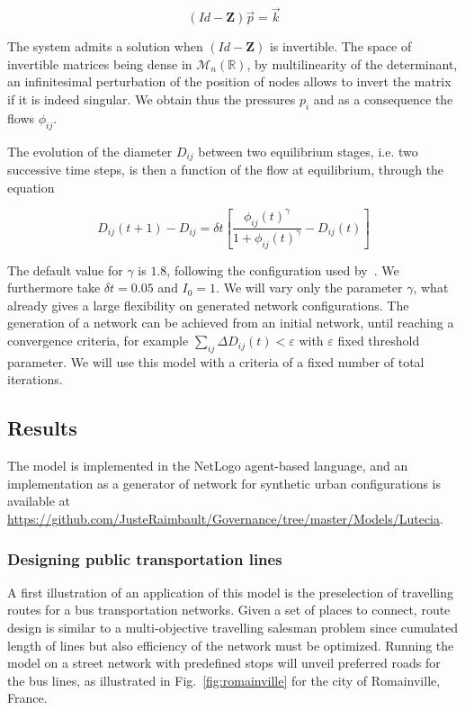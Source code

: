 \documentclass[runningheads,a4paper]{llncs2e/llncs}
\begin{document}
\begin{equation}
\left(Id - \mathbf{Z}\right) \vec{p} = \vec{k}
\end{equation}

The system admits a solution when $\left(Id - \mathbf{Z}\right)$ is invertible. The space of invertible matrices being dense in $\mathcal{M}_n(\mathbb{R})$, by multilinearity of the determinant, an infinitesimal perturbation of the position of nodes allows to invert the matrix if it is indeed singular. We obtain thus the pressures $p_i$ and as a consequence the flows $\phi_{ij}$.

The evolution of the diameter $D_{ij}$ between two equilibrium stages, i.e. two successive time steps, is then a function of the flow at equilibrium, through the equation

\begin{equation}
D_{ij} (t+1) - D_{ij} = \delta t \left[ \frac{\phi_{ij}(t)^\gamma}{1 + \phi_{ij}(t)^\gamma} - D_{ij}(t)\right]
\end{equation}

The default value for $\gamma$ is $1.8$, following the configuration used by~\cite{tero2010rules}. We furthermore take $\delta t = 0.05$ and $I_0 = 1$. We will vary only the parameter $\gamma$, what already gives a large flexibility on generated network configurations. The generation of a network can be achieved from an initial network, until reaching a convergence criteria, for example $\sum_{ij} \Delta D_{ij} (t) < \varepsilon$ with $\varepsilon$ fixed threshold parameter. We will use this model with a criteria of a fixed number of total iterations.


\subsection{Results}

The model is implemented in the NetLogo agent-based language, and an implementation as a generator of network for synthetic urban configurations is available at \url{https://github.com/JusteRaimbault/Governance/tree/master/Models/Lutecia}.


\subsubsection{Designing public transportation lines}

A first illustration of an application of this model is the preselection of travelling routes for a bus transportation networks. Given a set of places to connect, route design is similar to a multi-objective travelling salesman problem \cite{angus2007crowding} since cumulated length of lines but also efficiency of the network must be optimized. Running the model on a street network with predefined stops will unveil preferred roads for the bus lines, as illustrated in Fig.~\ref{fig:romainville} for the city of Romainville, France.
\end{document}
